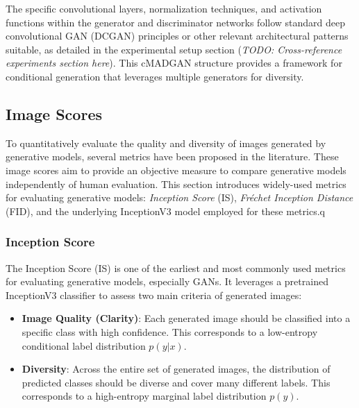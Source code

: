 The specific convolutional layers, normalization techniques, and activation functions within the generator and discriminator networks follow standard deep convolutional GAN (DCGAN) \cite{Radford2015DCGAN} principles or other relevant architectural patterns suitable, as detailed in the experimental setup section (\textit{TODO: Cross-reference experiments section here}). This cMADGAN structure provides a framework for conditional generation that leverages multiple generators for diversity. 





\subsection{Image Scores}\label{theoretical_image_scores}

To quantitatively evaluate the quality and diversity of images generated by generative models, several metrics have been proposed in the literature. These image scores aim to provide an objective measure to compare generative models independently of human evaluation. This section introduces widely-used metrics for evaluating generative models: \textit{Inception Score} (IS), \textit{Fréchet Inception Distance} (FID), and the underlying InceptionV3 model employed for these metrics.q

\subsubsection[Inception Score - IS]{Inception Score}
The Inception Score (IS) \cite{salimans2016improvedtechniquestraininggans} is one of the earliest and most commonly used metrics for evaluating generative models, especially GANs. It leverages a pretrained InceptionV3 classifier to assess two main criteria of generated images:

\begin{itemize}
    \item \textbf{Image Quality (Clarity)}: Each generated image should be classified into a specific class with high confidence. This corresponds to a low-entropy conditional label distribution \( p(y|x) \).
    \item \textbf{Diversity}: Across the entire set of generated images, the distribution of predicted classes should be diverse and cover many different labels. This corresponds to a high-entropy marginal label distribution \( p(y) \).
\end{itemize}

